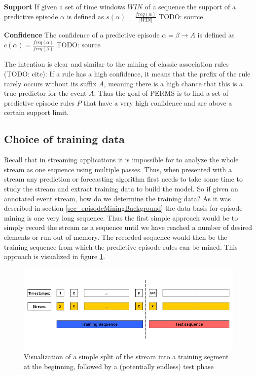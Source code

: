 \begin{mydef}
\label{def_support}
\textbf{Support} If given a set of time windows $WIN$ of a sequence the support of a predictive episode $\alpha$ is defined as $s(\alpha) = \frac{freq(\alpha)}{|WIN|}$ TODO: source
\end{mydef}

\begin{mydef}
\label{def_confidence}
\textbf{Confidence} The confidence of a predictive episode $\alpha = \beta \rightarrow A$ is defined as $c(\alpha) = \frac{freq(\alpha)}{freq(\beta)}$ TODO: source
\end{mydef}

The intention is clear and similar to the mining of classic association rules (TODO: cite): If a rule has a high confidence, it means that the prefix of the rule rarely occurs without its suffix $A$, meaning there is a high chance that this is a true predictor for the event $A$. Thus the goal of PERMS is to find a set of predictive episode rules $P$ that have a very high confidence and are above a certain support limit.

\subsection{Choice of training data}
Recall that in streaming applications it is impossible for to analyze the whole stream as one sequence using multiple passes. Thus, when presented with a stream any prediction or forecasting algorithm first needs to take some time to study the stream and extract training data to build the model. So if given an annotated event stream, how do we determine the training data? As it was described in section \ref{sec_episodeMiningBackground} the data basis for episode mining is one very long sequence. Thus the first simple approach would be to simply record the stream as a sequence until we have reached a number of desired elements or run out of memory. The recorded sequence would then be the training sequence from which the predictive episode rules can be mined. This approach is visualized in figure \ref{fig_trainingDataNaive}.

\begin{figure}[h]
	\centering
  	\includegraphics[width=\textwidth]{trainingDataNaive}
	\caption{Visualization of a simple split of the stream into a training segment at the beginning, followed by a (potentially endless) test phase}
	\label{fig_trainingDataNaive}
\end{figure}

